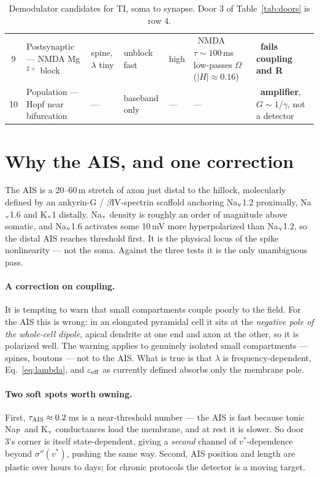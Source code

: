 \documentclass[11pt,a4paper]{article}
\newcommand{\yes}{\textcolor{green!45!black}{\ding{51}}}
\newcommand{\no}{\textcolor{red!70!black}{\ding{55}}}
\begin{document}
\begin{landscape}
\begin{table}
\begin{tabular}{@{}c L{3.5cm} C{2.5cm} C{2.6cm} L{2.0cm} L{3.9cm} L{4.4cm}@{}}
9 & Postsynaptic --- NMDA Mg$^{2+}$ block & spine, $\lambda$ tiny & unblock fast \quad \yes & high & \no\ NMDA $\tau\!\sim\!100$\,ms low-passes $\Omega$ ($|H|\!\approx\!0.16$) & \no\ \textbf{fails coupling and R} \\
10 & Population --- Hopf near bifurcation & --- & baseband only & --- & --- & \no\ \textbf{amplifier}, $G\sim1/\gamma$, not a detector \\
\bottomrule
\end{tabular}
\caption{Demodulator candidates for TI, soma to synapse. Door 3 of Table~\ref{tab:doors} is row 4.}
\label{tab:cands}
\end{table}
\end{landscape}

\section{Why the AIS, and one correction}

The AIS is a 20--60\,\textmu m stretch of axon just distal to the hillock, molecularly defined by an
ankyrin-G / $\beta$IV-spectrin scaffold anchoring Na$_{\rm v}$1.2 proximally, Na$_{\rm v}$1.6 and
K$_{\rm v}$1 distally. Na$_{\rm v}$ density is roughly an order of magnitude above somatic, and
Na$_{\rm v}$1.6 activates some 10\,mV more hyperpolarized than Na$_{\rm v}$1.2, so the distal AIS
reaches threshold first. It is the physical locus of the spike nonlinearity --- not the soma. Against
the three tests it is the only unambiguous pass.

\paragraph{A correction on coupling.} It is tempting to warn that small compartments couple poorly to
the field. For the AIS this is wrong: in an elongated pyramidal cell it sits at the \emph{negative pole
of the whole-cell dipole}, apical dendrite at one end and axon at the other, so it is polarized well.
The warning applies to genuinely isolated small compartments --- spines, boutons --- not to the AIS.
What is true is that $\lambda$ is frequency-dependent, Eq.~\eqref{eq:lambda}, and
$\varepsilon_{\rm eff}$ as currently defined absorbs only the membrane pole.

\paragraph{Two soft spots worth owning.} First, $\tau_{\rm AIS}\approx0.2$\,ms is a near-threshold
number --- the AIS is fast because tonic Na$_{\rm P}$ and K$_{\rm v}$ conductances load the membrane,
and at rest it is slower. So door 3's corner is itself state-dependent, giving a \emph{second} channel
of $v^*$-dependence beyond $\sigma''(v^*)$, pushing the same way. Second, AIS position and length are
plastic over hours to days; for chronic protocols the detector is a moving target.
\end{document}
